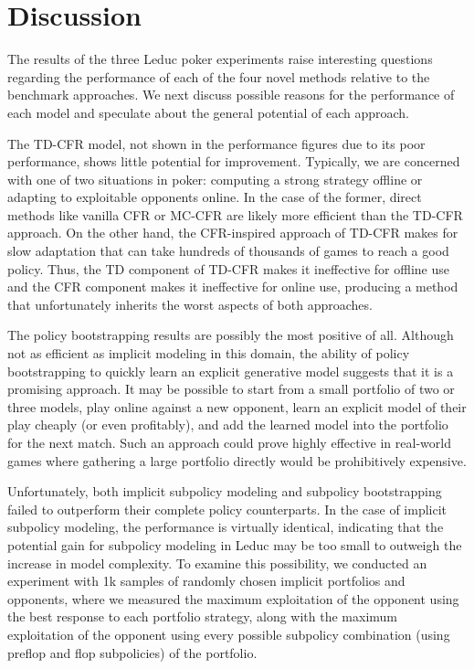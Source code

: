 \documentclass{aamas2013}
\begin{document}
\section{Discussion}
The results of the three Leduc poker experiments raise interesting questions regarding the performance of each of the four novel methods relative to the benchmark approaches. We next discuss possible reasons for the performance of each model and speculate about the general potential of each approach.

The TD-CFR model, not shown in the performance figures due to its poor performance, shows little potential for improvement. Typically, we are concerned with one of two situations in poker: computing a strong strategy offline or adapting to exploitable opponents online. In the case of the former, direct methods like vanilla CFR or MC-CFR are likely more efficient than the TD-CFR approach. On the other hand, the CFR-inspired approach of TD-CFR makes for slow adaptation that can take hundreds of thousands of games to reach a good policy. Thus, the TD component of TD-CFR makes it ineffective for offline use and the CFR component makes it ineffective for online use, producing a method that unfortunately inherits the worst aspects of both approaches.

The policy bootstrapping results are possibly the most positive of all. Although not as efficient as implicit modeling in this domain, the ability of policy bootstrapping to quickly learn an explicit generative model suggests that it is a promising approach. It may be possible to start from a small portfolio of two or three models, play online against a new opponent, learn an explicit model of their play cheaply (or even profitably), and add the learned model into the portfolio for the next match. Such an approach could prove highly effective in real-world games where gathering a large portfolio directly would be prohibitively expensive.

Unfortunately, both implicit subpolicy modeling and subpolicy bootstrapping failed to outperform their complete policy counterparts. In the case of implicit subpolicy modeling, the performance is virtually identical, indicating that the potential gain for subpolicy modeling in Leduc may be too small to outweigh the increase in model complexity. To examine this possibility, we conducted an experiment with 1k samples of randomly chosen implicit portfolios and opponents, where we measured the maximum exploitation of the opponent using the best response to each portfolio strategy, along with the maximum exploitation of the opponent using every possible subpolicy combination (using preflop and flop subpolicies) of the portfolio.
\end{document}
